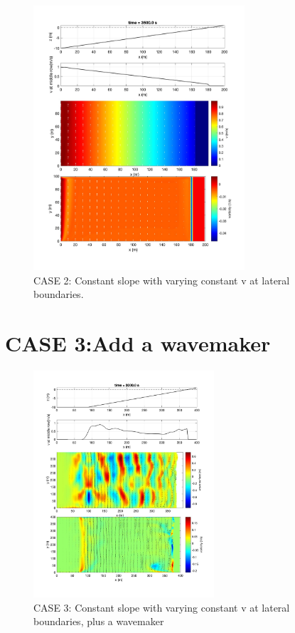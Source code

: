 \documentclass[preprint,10pt]{elsarticle}
\begin{document}
\begin{figure}
\begin{center}
 \includegraphics[width=0.7\textwidth]{../TEST_couplingbc_wavemaker/postprocessing/case_slope_055_reduced_v.jpg}
 \caption{CASE 2: Constant slope with varying constant v at lateral boundaries.}
 \label{v2}
 \end{center}
 \end{figure}
  
  \newpage
\section*{CASE 3:Add a wavemaker}
  
  \begin{figure}
\begin{center}
 \includegraphics[width=0.6\textwidth]{../TEST_couplingbc_wavemaker/postprocessing/case_slope_wave.jpg}
 \caption{CASE 3: Constant slope with varying constant v at lateral boundaries, plus a wavemaker}
 \label{v2}
 \end{center}
 \end{figure}
 
\end{document}
